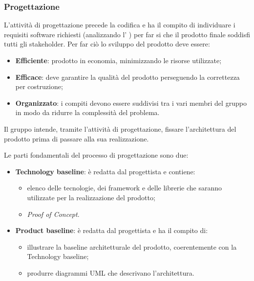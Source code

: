 \subsubsection{Progettazione}
L'attività di progettazione precede la codifica e ha il compito di individuare i requisiti software richiesti (analizzando l' ) per far si che il prodotto finale soddisfi tutti gli stakeholder. Per far ciò lo sviluppo del prodotto deve essere:
\begin{itemize}
\item \textbf{Efficiente}: prodotto in economia, minimizzando le risorse utilizzate;
\item \textbf{Efficace}: deve garantire la qualità del prodotto perseguendo la correttezza per costruzione;
\item \textbf{Organizzato}: i compiti devono essere suddivisi tra i vari membri del gruppo in modo da ridurre la complessità del problema.
\end{itemize}

Il gruppo \Omicron{} intende, tramite l'attività di progettazione, fissare l'architettura del prodotto prima di passare alla sua realizzazione. 

Le parti fondamentali del processo di progettazione sono due:
\begin{itemize}
\item \textbf{Technology baseline}: è redatta dal progettista e contiene:
\begin{itemize}
\item elenco delle tecnologie, dei framework e delle librerie che saranno utilizzate per la realizzazione del prodotto;
\item \textit{Proof of Concept}.
\end{itemize}
\item \textbf{Product baseline}: è redatta dal progettista e ha il compito di:
\begin{itemize}
\item illustrare la baseline architetturale del prodotto, coerentemente con la Technology baseline;
\item produrre diagrammi UML che descrivano l'architettura.
\end{itemize}
\end{itemize} 

